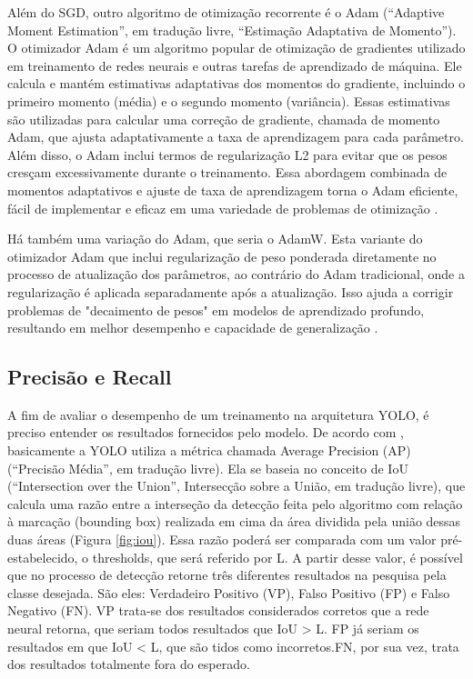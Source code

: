 Além do SGD, outro algoritmo de otimização recorrente é o Adam (“Adaptive Moment Estimation”, em tradução livre, “Estimação Adaptativa de Momento”). O otimizador Adam é um algoritmo popular de otimização de gradientes utilizado em treinamento de redes neurais e outras tarefas de aprendizado de máquina. Ele calcula e mantém estimativas adaptativas dos momentos do gradiente, incluindo o primeiro momento (média) e o segundo momento (variância). Essas estimativas são utilizadas para calcular uma correção de gradiente, chamada de momento Adam, que ajusta adaptativamente a taxa de aprendizagem para cada parâmetro. Além disso, o Adam inclui termos de regularização L2 para evitar que os pesos cresçam excessivamente durante o treinamento. Essa abordagem combinada de momentos adaptativos e ajuste de taxa de aprendizagem torna o Adam eficiente, fácil de implementar e eficaz em uma variedade de problemas de otimização \cite{kingma2014adam}.

Há também uma variação do Adam, que seria o AdamW. Esta variante do otimizador Adam que inclui regularização de peso ponderada diretamente no processo de atualização dos parâmetros, ao contrário do Adam tradicional, onde a regularização é aplicada separadamente após a atualização. Isso ajuda a corrigir problemas de "decaimento de pesos" em modelos de aprendizado profundo, resultando em melhor desempenho e capacidade de generalização \cite{zhou2024towards}.

\subsection{Precisão e Recall}
\label{sec:precisaorecall}

A fim de avaliar o desempenho de um treinamento na arquitetura YOLO, é preciso entender os resultados fornecidos pelo modelo. De acordo com \cite{padilla2020survey}, basicamente a YOLO utiliza a métrica chamada Average Precision (AP) (“Precisão Média”, em tradução livre). Ela se baseia no conceito de IoU (“Intersection over the Union”, Intersecção sobre a União, em tradução livre), que calcula uma razão entre a interseção da detecção feita pelo algoritmo com relação à marcação (bounding box) realizada em cima da área dividida pela união dessas duas áreas (Figura \ref{fig:iou}). Essa razão poderá ser comparada com um valor pré-estabelecido, o thresholds, que será referido por L. A partir desse valor, é possível que no processo de detecção retorne três diferentes resultados na pesquisa pela classe desejada. São eles: Verdadeiro Positivo (VP), Falso Positivo (FP) e Falso Negativo (FN). VP trata-se dos resultados considerados corretos que a rede neural retorna, que seriam todos resultados que IoU > L. FP já seriam os resultados em que IoU < L, que são tidos como incorretos.FN, por sua vez, trata dos resultados totalmente fora do esperado.

